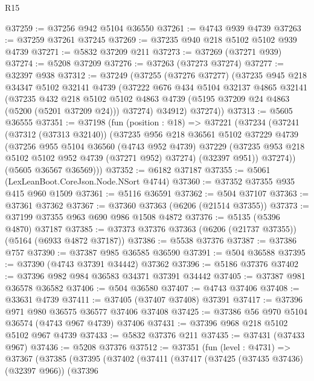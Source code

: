 \begin{lexlean}{R15}
\begin{coremodule}
{{{{{{{{{{{@37259 := @37256 @942 @5104 @36550
@37261 := @4743 @939 @4739
@37263 := @37259 @37261 @37245
@37269 := @37235 @940 @218 @5102 @5102 @939 @4739
@37271 := @5832 @37209 @211
@37273 := @37269 (@37271 @939)
@37274 := @5208 @37209
@37276 := @37263 (@37273 @37274)
@37277 := @32397 @938
@37312 := @37249
    (@37255
      (@37276 @37277)
      (@37235
        @945
        @218
        @34347
        @5102
        @32141
        @4739
        (@37222
          @676
          @434
          @5104
          @32137
          @4865
          @32141
          (@37235
            @432
            @218
            @5102
            @5102
            @4863
            @4739
            (@5195 @37209 @24 @4863 (@5200 (@5201 @37209 @24)))
            @37274)
          @34912)
        @37274))
@37313 := @5605 @36555
@37351 := @37198
    (fun (position : @18) =>
    @37221
      (@37234
        (@37241
          (@37312 (@37313 @32140))
          (@37235
            @956
            @218
            @36561
            @5102
            @37229
            @4739
            (@37256
              @955
              @5104
              @36560
              (@4743 @952 @4739)
              @37229
              (@37235 @953 @218 @5102 @5102 @952 @4739 (@37271 @952) @37274)
              (@32397 @951))
            @37274))
        (@5605 @36567 @36569)))
@37352 := @6182 @37187
@37355 := @5061 (LexLeanBoot.CoreJson.Node.NSort @4744)
@37360 := @37352 @37355 @935 @415 @960 @1509
@37361 := @5116 @36591
@37362 := @504 @37107
@37363 := @37361 @37362
@37367 := @37360 @37363 (@6206 (@21514 @37355))
@37373 := @37199 @37355 @963 @690 @986 @1508 @4872
@37376 := @5135 (@5396 @4870) @37187
@37385 := @37373 @37376 @37363 (@6206 (@21737 @37355)) (@5164 (@6933 @4872 @37187))
@37386 := @5538 @37376
@37387 := @37386 @757
@37390 := @37387 @985 @36585 @36590
@37391 := @504 @36588
@37395 := @37390 (@4743 @37391 @34442) @37362
@37396 := @5186 @37376
@37402 := @37396 @982 @984 @36583 @34371 @37391 @34442
@37405 := @37387 @981 @36578 @36582
@37406 := @504 @36580
@37407 := @4743 @37406
@37408 := @33631 @4739
@37411 := @37405 (@37407 @37408) @37391
@37417 := @37396 @971 @980 @36575 @36577 @37406 @37408
@37425 := @37386 @56 @970 @5104 @36574 (@4743 @967 @4739) @37406
@37431 := @37396 @968 @218 @5102 @5102 @967 @4739
@37433 := @5832 @37376 @211
@37435 := @37431 (@37433 @967)
@37436 := @5208 @37376
@37512 := @37351
    (fun (level : @4731) =>
    @37367
      (@37385
        (@37395
          (@37402
            (@37411
              (@37417
                (@37425 (@37435 @37436) (@32397 @966))
                (@37396
}}}}}}}}}}}
\end{coremodule}
\end{lexlean}
